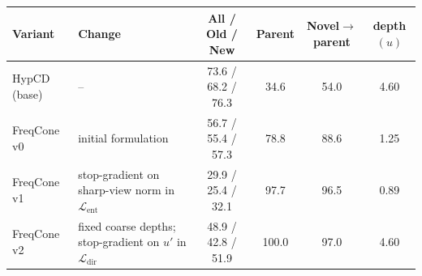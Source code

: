 \begin{tabular}{llcccc}
\toprule
Variant & Change & All / Old / New & Parent & Novel$\to$parent & depth$(u)$ \\
\midrule
HypCD (base) & -- & 73.6 / 68.2 / 76.3 & 34.6 & 54.0 & 4.60 \\
FreqCone v0 & initial formulation & 56.7 / 55.4 / 57.3 & 78.8 & 88.6 & 1.25 \\
FreqCone v1 & stop-gradient on sharp-view norm in $\mathcal{L}_{\mathrm{ent}}$ & 29.9 / 25.4 / 32.1 & 97.7 & 96.5 & 0.89 \\
FreqCone v2 & fixed coarse depths; stop-gradient on $u'$ in $\mathcal{L}_{\mathrm{dir}}$ & 48.9 / 42.8 / 51.9 & 100.0 & 97.0 & 4.60 \\
\bottomrule
\end{tabular}
